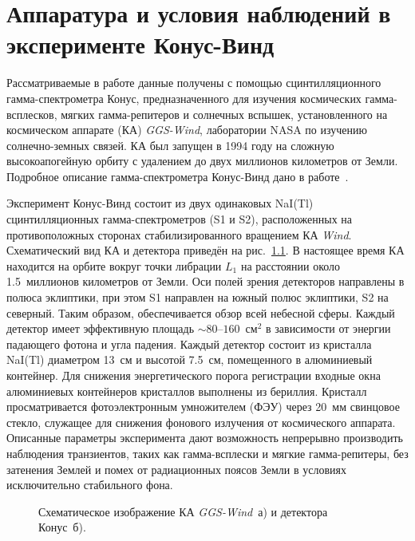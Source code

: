 \chapter{Аппаратура и условия наблюдений в эксперименте Конус-Винд} \label{KW_description}
Рассматриваемые в работе данные получены с помощью сцинтилляционного гамма-спектрометра 
Конус, предназначенного для изучения космических гамма-всплесков, мягких гамма-репитеров и солнечных вспышек,
установленного на космическом аппарате (КА) \textit{GGS-Wind}, лаборатории NASA по изучению 
солнечно-земных связей. КА был запущен в 1994 году на сложную высокоапогейную орбиту 
с удалением до двух миллионов километров от Земли. Подробное описание гамма-спектрометра 
Конус-Винд дано в работе~\citep{Aptekar1995SSR}.

Эксперимент Конус-Винд состоит из двух одинаковых NaI(Tl) сцинтилляционных 
гамма-спектрометров (S1 и S2), расположенных на противоположных сторонах 
стабилизированного вращением КА \textit{Wind}. 
Схематический вид КА и детектора приведён на рис.~\ref{img:KW_main_view}.
В настоящее время КА находится на орбите вокруг точки либрации $L_1$ 
на расстоянии около 1.5~миллионов километров от Земли. Оси полей зрения детекторов 
направлены в полюса эклиптики, при этом S1 направлен на южный полюс эклиптики, 
S2 на северный. Таким образом, обеспечивается обзор всей небесной сферы. 
Каждый детектор имеет эффективную площадь $\sim 80\textrm{--}160$~см$^2$ в 
зависимости от энергии падающего фотона и угла падения. Каждый детектор состоит 
из кристалла NaI(Tl) диаметром 13~см и высотой 7.5~см, помещенного в алюминиевый 
контейнер. Для снижения энергетического порога регистрации входные окна алюминиевых 
контейнеров кристаллов выполнены из бериллия. Кристалл просматривается фотоэлектронным 
умножителем (ФЭУ) через 20~мм свинцовое стекло, служащее для снижения фонового 
излучения от космического аппарата. Описанные параметры эксперимента дают 
возможность непрерывно производить наблюдения транзиентов, таких как гамма-всплески 
и мягкие гамма-репитеры, без затенения Землей и помех от радиационных поясов Земли 
в условиях исключительно стабильного фона. 

\begin{figure}[h]
  \begin{minipage}[h]{0.5\textwidth}
  \end{minipage}
  \hfill
  \begin{minipage}[h]{0.5\textwidth}
  \end{minipage}
  \caption[Схематическое изображение КА \textit{GGS-Wind} и детектора Конус.]
  {Схематическое изображение КА \textit{GGS-Wind}~а) и детектора Конус~б).}
  \label{img:KW_main_view}  
\end{figure}

